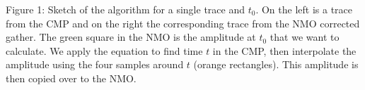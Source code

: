 Figure 1: Sketch of the algorithm for a single trace and $t_0$. On the left
is a trace from the CMP and on the right the corresponding trace from the NMO
corrected gather. The green square in the NMO is the amplitude  at $t_0$ that
we want to calculate. We apply the equation to find time $t$ in the CMP, then
interpolate the amplitude using the four samples around $t$ (orange
rectangles). This amplitude is then copied over to the NMO.
